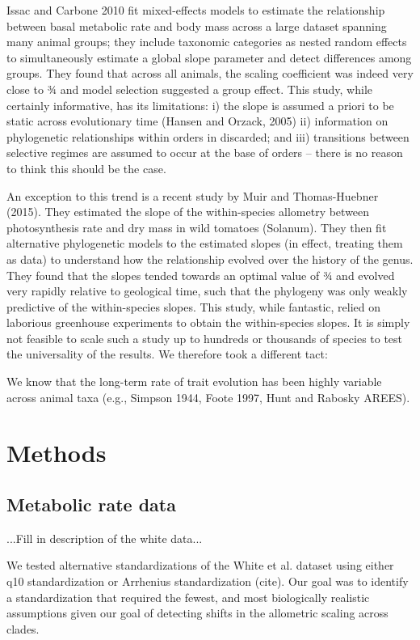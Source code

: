 \documentclass[a4paper,11pt]{article}
\begin{document}
Issac and Carbone 2010 fit mixed-effects models to estimate the relationship between basal metabolic rate and body mass across a large dataset spanning many animal groups; they include taxonomic categories as nested random effects to simultaneously estimate a global slope parameter and detect differences among groups. They found that across all animals, the scaling coefficient was indeed very close to ¾ and model selection suggested a group effect. This study, while certainly informative, has its limitations: i) the slope is assumed a priori to be static across evolutionary time (Hansen and Orzack, 2005) ii) information on phylogenetic relationships within orders in discarded; and iii) transitions between selective regimes are assumed to occur at the base of orders -- there is no reason to think this should be the case.

An exception to this trend is a recent study by Muir and Thomas-Huebner (2015). They estimated the slope of the within-species allometry between photosynthesis rate and dry mass in wild tomatoes (Solanum). They then fit alternative phylogenetic models to the estimated slopes (in effect, treating them as data) to understand how the relationship evolved over the history of the genus. They found that the slopes tended towards an optimal value of ¾ and evolved very rapidly relative to geological time, such that the phylogeny was only weakly predictive of the within-species slopes. This study, while fantastic, relied on laborious greenhouse experiments to obtain the within-species slopes. It is simply not feasible to scale such a study up to hundreds or thousands of species to test the universality of the results. We therefore took a different tact: 

We know that the long-term rate of trait evolution has been highly variable across animal taxa (e.g., Simpson 1944, Foote 1997, Hunt and Rabosky AREES).

\section*{Methods}

\subsection*{Metabolic rate data}
...Fill in description of the white data...

We tested alternative standardizations of the White et al. dataset using either q10 standardization or Arrhenius standardization (cite). Our goal was to identify a standardization that required the fewest, and most biologically realistic assumptions given our goal of detecting shifts in the allometric scaling across clades. 
\end{document}
